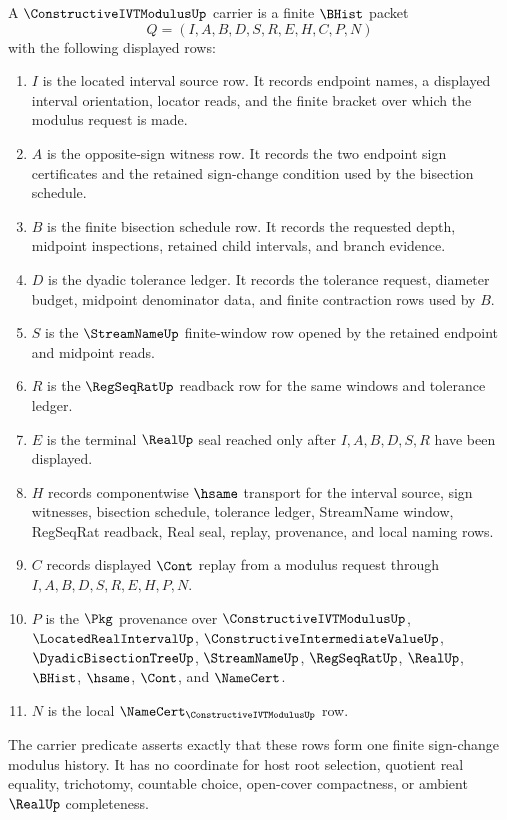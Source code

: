 \begin{definition}
\label{def:constructive-ivt-modulus-carrier}
A $\ConstructiveIVTModulusUp$ carrier is a finite $\BHist$ packet
$$
Q=(I,A,B,D,S,R,E,H,C,P,N)
$$
with the following displayed rows:
\begin{enumerate}
\item $I$ is the located interval source row. It records endpoint names, a displayed interval orientation, locator reads, and the finite bracket over which the modulus request is made.
\item $A$ is the opposite-sign witness row. It records the two endpoint sign certificates and the retained sign-change condition used by the bisection schedule.
\item $B$ is the finite bisection schedule row. It records the requested depth, midpoint inspections, retained child intervals, and branch evidence.
\item $D$ is the dyadic tolerance ledger. It records the tolerance request, diameter budget, midpoint denominator data, and finite contraction rows used by $B$.
\item $S$ is the $\StreamNameUp$ finite-window row opened by the retained endpoint and midpoint reads.
\item $R$ is the $\RegSeqRatUp$ readback row for the same windows and tolerance ledger.
\item $E$ is the terminal $\RealUp$ seal reached only after $I,A,B,D,S,R$ have been displayed.
\item $H$ records componentwise $\hsame$ transport for the interval source, sign witnesses, bisection schedule, tolerance ledger, StreamName window, RegSeqRat readback, Real seal, replay, provenance, and local naming rows.
\item $C$ records displayed $\Cont$ replay from a modulus request through $I,A,B,D,S,R,E,H,P,N$.
\item $P$ is the $\Pkg$ provenance over $\ConstructiveIVTModulusUp$, $\LocatedRealIntervalUp$, $\ConstructiveIntermediateValueUp$, $\DyadicBisectionTreeUp$, $\StreamNameUp$, $\RegSeqRatUp$, $\RealUp$, $\BHist$, $\hsame$, $\Cont$, and $\NameCert$.
\item $N$ is the local $\NameCert_{\ConstructiveIVTModulusUp}$ row.
\end{enumerate}
The carrier predicate asserts exactly that these rows form one finite sign-change modulus history. It has no coordinate for host root selection, quotient real equality, trichotomy, countable choice, open-cover compactness, or ambient $\RealUp$ completeness.
\end{definition}

